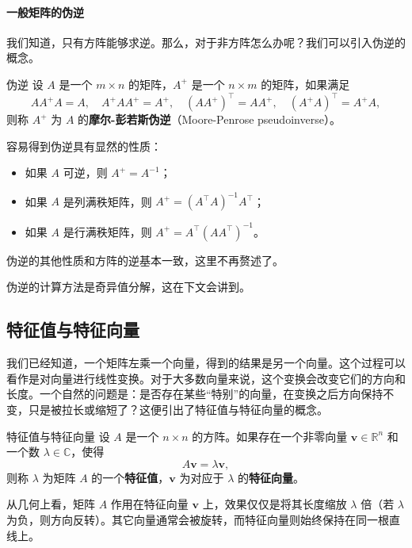 \paragraph{一般矩阵的伪逆}

我们知道，只有方阵能够求逆。那么，对于非方阵怎么办呢？我们可以引入伪逆的概念。
\begin{definition}{伪逆}{}
    设 \(A\) 是一个 \(m \times n\) 的矩阵，\(A^+\) 是一个 \(n \times m\) 的矩阵，如果满足
    \[
        AA^+A = A, \quad A^+AA^+ = A^+, \quad (AA^+)^\top = AA^+, \quad (A^+A)^\top = A^+A,
    \]
    则称 \(A^+\) 为 \(A\) 的\textbf{摩尔-彭若斯伪逆}（Moore-Penrose pseudoinverse）。
\end{definition}
容易得到伪逆具有显然的性质：
\begin{itemize}
    \item 如果 \(A\) 可逆，则 \(A^+ = A^{-1}\)；
    \item 如果 \(A\) 是列满秩矩阵，则 \(A^+ = (A^\top A)^{-1} A^\top\)；
    \item 如果 \(A\) 是行满秩矩阵，则 \(A^+ = A^\top (A A^\top)^{-1}\)。
\end{itemize}
伪逆的其他性质和方阵的逆基本一致，这里不再赘述了。

伪逆的计算方法是奇异值分解，这在下文会讲到。

\subsection{特征值与特征向量}

我们已经知道，一个矩阵左乘一个向量，得到的结果是另一个向量。这个过程可以看作是对向量进行线性变换。对于大多数向量来说，这个变换会改变它们的方向和长度。一个自然的问题是：是否存在某些“特别”的向量，在变换之后方向保持不变，只是被拉长或缩短了？这便引出了特征值与特征向量的概念。

\begin{definition}{特征值与特征向量}{}
    设 \(A\) 是一个 \(n \times n\) 的方阵。如果存在一个非零向量 \(\mathbf{v} \in \mathbb{R}^n\) 和一个数 \(\lambda \in \mathbb{C}\)，使得
    \[
        A\mathbf{v} = \lambda \mathbf{v},
    \]
    则称 \(\lambda\) 为矩阵 \(A\) 的一个\textbf{特征值}，\(\mathbf{v}\) 为对应于 \(\lambda\) 的\textbf{特征向量}。
\end{definition}

从几何上看，矩阵 \(A\) 作用在特征向量 \(\mathbf{v}\) 上，效果仅仅是将其长度缩放 \(\lambda\) 倍（若 \(\lambda\) 为负，则方向反转）。其它向量通常会被旋转，而特征向量则始终保持在同一根直线上。

